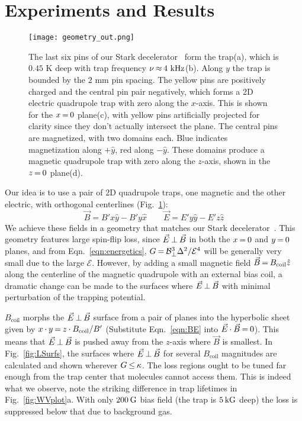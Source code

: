 \documentclass[%
 reprint,
 amsmath,amssymb,
 aps,
pra,
]{revtex4-1}
\newcommand{\bcl}{{$B_\text{coil}$}}
\newcommand{\epb}{{$\vec{E}\s {\perp}\s\vec{B}$}}
\newcommand{\s}{{\nobreak\hspace{.2em}}}
\begin{document}
\section{Experiments and Results\label{sec:results}}


\begin{figure}[tb]
\texttt{[image: geometry\_out.png]}
\caption{
The last six pins of our Stark decelerator~\cite{Sawyer2008} form the trap\s(a), which is $0.45\text{ K}$ deep with trap frequency $\nu\s {\approx}\s 4\text{ kHz}$\s(b).
Along $y$ the trap is bounded by the $2\text{ mm}$ pin spacing.
The yellow pins are positively charged and the central pin pair negatively, which forms a 2D electric quadrupole trap with zero along the $x$-axis.
This is shown for the $x\s {=}\s 0$ plane\s(c), with yellow pins artificially projected for clarity since they don't actually intersect the plane.
The central pins are magnetized, with two domains each.
Blue indicates magnetization along $+\hat{y}$, red along $-\hat{y}$.
These domains produce a magnetic quadrupole trap with zero along the $z$-axis, shown in the $z\s {=}\s 0$ plane\s(d).
\label{fig:CAD}}
\end{figure}

Our idea is to use a pair of 2D quadrupole traps, one magnetic and the other electric, with orthogonal centerlines (Fig.~\ref{fig:CAD}):
\begin{equation}
\label{eqn:BE}
\vec{B}=B'x\hat{y}-B'y\hat{x}\quad\quad\vec{E}=E'y\hat{y}-E'z\hat{z}
\end{equation}
We achieve these fields in a geometry that matches our Stark decelerator~\cite{Bochinski2003}.
This geometry features large spin-flip loss, since \epb{} in both the $x\s {=}\s 0$ and $y\s {=}\s 0$ planes, and from Eqn.~\ref{eqn:energetics}, $G\s {=} \s \mathcal{B}_\perp^3\Delta^2/\mathcal{E}^4$ will be generally very small due to the large $\mathcal{E}$.
However, by adding a small magnetic field $\vec{B}\s {=}\s B_\text{coil}\hat{z}$ along the centerline of the magnetic quadrupole with an external bias coil, a dramatic change can be made to the surfaces where \epb{} with minimal perturbation of the trapping potential.

\bcl{} morphs the \epb{} surface from a pair of planes into the hyperbolic sheet given by
$x\s {\cdot}\s y\s {=}\s  z\s {\cdot}\s B_\text{coil}/B'$
(Substitute Eqn.~\ref{eqn:BE} into  $\vec{E}\s {\cdot}\s\vec{B}\s {=}\s 0$).
This means that \epb{} is pushed away from the $z$-axis where $\vec{B}$ is smallest.
In Fig.~\ref{fig:LSurfs}, the surfaces where \epb{} for several \bcl{} magnitudes are calculated and shown wherever $G\s {\le}\s\kappa$.
The loss regions ought to be tuned far enough from the trap center that molecules cannot access them.
This is indeed what we observe, note the striking difference in trap lifetimes in Fig.~\ref{fig:WVplot}a.
With only $200\s\text{G}$ bias field (the trap is $5\s\text{kG}$ deep) the loss is suppressed below that due to background gas.
\end{document}

